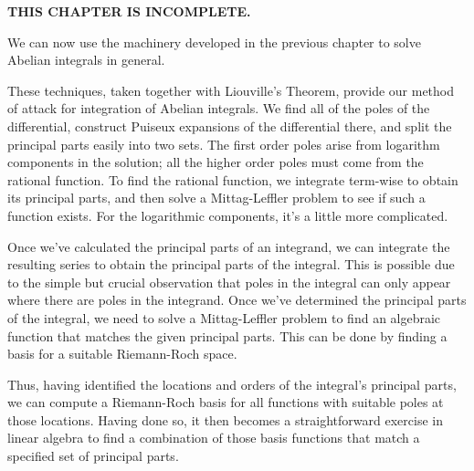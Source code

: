 

{\bf THIS CHAPTER IS INCOMPLETE.}

We can now use the machinery developed in the previous chapter to
solve Abelian integrals in general.



These techniques, taken together with Liouville's Theorem, provide
our method of attack for integration of Abelian integrals.  We find
all of the poles of the differential, construct Puiseux expansions of
the differential there, and split the principal parts easily into two
sets.  The first order poles arise from logarithm components in the
solution; all the higher order poles must come from the rational
function.  To find the rational function, we integrate term-wise to
obtain its principal parts, and then solve a Mittag-Leffler problem to
see if such a function exists.  For the logarithmic components,
it's a little more complicated.

Once we've calculated the principal parts of an integrand, we can
integrate the resulting series to obtain the principal parts of the
integral.  This is possible due to the simple but crucial observation
that poles in the integral can only appear where there are poles in
the integrand.  Once we've determined the principal parts of the
integral, we need to solve a Mittag-Leffler problem to find an
algebraic function that matches the given principal parts.  This can
be done by finding a basis for a suitable Riemann-Roch space.

Thus, having identified the
locations and orders of the integral's principal parts, we can compute
a Riemann-Roch basis for all functions with suitable poles at those
locations.  Having done so, it then becomes a straightforward exercise
in linear algebra to find a combination of those basis functions
that match a specified set of principal parts.


\begin{comment}
The techniques of the previous chapter suffice to compute the {\it
algebraic} portion of an Abelian integral, which is to say, an
algebraic function.  Liouville's theorem, however, tells us that there
can also be logarithmic components in the integral.  The two can be
easily separated, since the rational portion of the integral
corresponds to poles of second order poles and higher in the integrand,
while the logarithmic portion corresponds to first order poles
in the integrand.
\end{comment}

